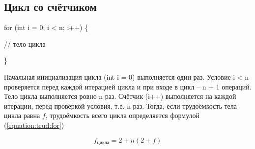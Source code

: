         \subsection{Цикл со счётчиком}
            for (int i = 0; i < n; i++) \{

                // тело цикла

            \}
            
            Начальная инициализация цикла (int i = 0) выполняется один раз.
            Условие i < n проверяется перед каждой итерацией цикла и при входе в цикл -- n + 1 операций.
            Тело цикла выполняется ровно n раз.
            Счётчик (i++) выполняется на каждой итерации, перед проверкой условия, т.е. n раз.
            Тогда, если трудоёмкость тела цикла равна $ f $, трудоёмкость всего цикла определяется формулой (\ref{equation:trud:for})

            \begin{equation}
                f_\text{цикла} = 2 + n(2 + f)
                \label{equation:trud:for}
            \end{equation}

\newpage